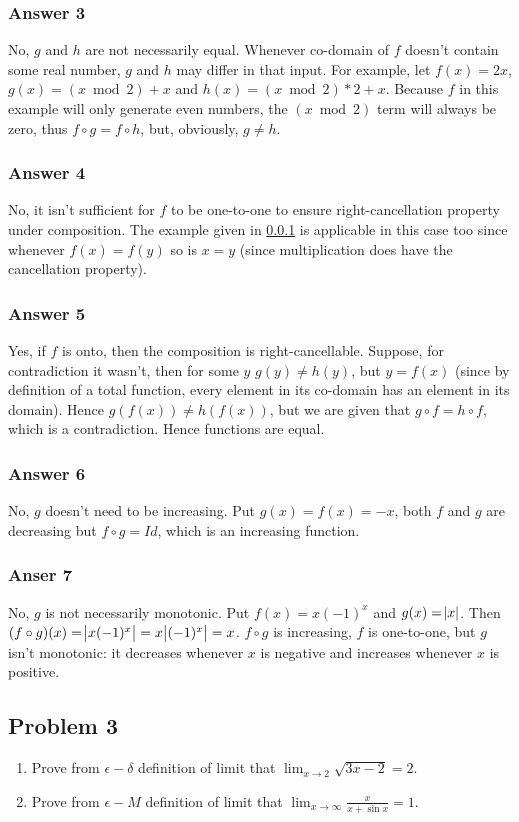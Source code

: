 \documentclass[11pt]{article}
\begin{document}
\subsubsection{Answer 3}
\label{sec-1-2-1}
No, $g$ and $h$ are not necessarily equal.  Whenever co-domain of $f$
doesn't contain some real number, $g$ and $h$ may differ in that input.
For example, let $f(x) = 2x$, $g(x) = (x \bmod 2) + x$ and
$h(x) = (x \bmod 2) * 2 + x$.  Because $f$ in this example will only
generate even numbers, the $(x \bmod 2)$ term will always be zero,
thus $f \circ g = f \circ h$, but, obviously, $g \neq h$.
\subsubsection{Answer 4}
\label{sec-1-2-2}
No, it isn't sufficient for $f$ to be one-to-one to ensure right-cancellation
property under composition.  The example given in \ref{sec-1-2-1} is applicable
in this case too since whenever $f(x) = f(y)$ so is $x = y$ (since multiplication
does have the cancellation property).
\subsubsection{Answer 5}
\label{sec-1-2-3}
Yes, if $f$ is onto, then the composition is right-cancellable.  Suppose,
for contradiction it wasn't, then for some $y$ $g(y) \neq h(y)$, but
$y = f(x)$ (since by definition of a total function, every element in
its co-domain has an element in its domain).  Hence $g(f(x)) \neq h(f(x))$,
but we are given that $g \circ f = h \circ f$, which is a contradiction.
Hence functions are equal.
\subsubsection{Answer 6}
\label{sec-1-2-4}
No, $g$ doesn't need to be increasing.  Put $g(x) = f(x) = -x$, both $f$
and $g$ are decreasing but $f \circ g = Id$, which is an increasing function.
\subsubsection{Anser 7}
\label{sec-1-2-5}
No, $g$ is not necessarily monotonic.  Put $f(x) = x(-1)^x$ and $g(x) = \abs{x}$.
Then $(f \circ g)(x) = \abs{x(-1)^x} = x\abs{(-1)^x} = x$.  $f \circ g$ is
increasing, $f$ is one-to-one, but $g$ isn't monotonic: it decreases whenever
$x$ is negative and increases whenever $x$ is positive.
\subsection{Problem 3}
\label{sec-1-3}
\begin{enumerate}
\item Prove from $\epsilon-\delta$ definition of limit that 
      $\lim_{x \to 2}\sqrt{3x - 2} = 2$.
\item Prove from $\epsilon-M$ definition of limit that 
      $\lim_{x \to \infty}\frac{x}{x+\sin x} = 1$.
\end{enumerate}
\end{document}
